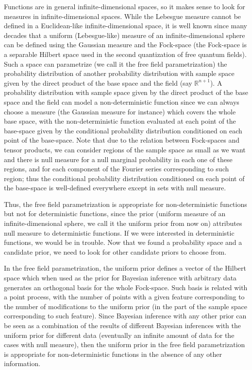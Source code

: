 \documentclass[11pt]{book}
\begin{document}
Functions are in general infinite-dimensional spaces, so it makes sense
to look for measures in infinite-dimensional spaces. While the Lebesgue
measure cannot be defined in a Euclidean-like infinite-dimensional
space\cite{baker1991lebesgue}\cite{baker2004lebesgue}, it is
well known since many decades that a uniform (Lebesgue-like) measure of
an infinite-dimensional sphere can be defined using the Gaussian measure
and the Fock-space (the Fock-space is a separable Hilbert space used in
the second quantization of free quantum
fields)\cite{peterson_gaussian_2019}.
Such a space can parametrize (we call it the free field parametrization)
the probability distribution of another probability distribution with
sample space given by the direct product of the base space and the field
(say \(\mathbb{R}^{n+1}\)). A probability distribution with sample space
given by the direct product of the base space and the field can model a
non-deterministic function since we can always choose a measure (the
Gaussian measure for instance) which covers the whole base space, with
the non-deterministic function evaluated at each point of the base-space
given by the conditional probability distribution conditioned on each
point of the base-space. Note that due to the relation between
Fock-spaces and tensor products, we can consider regions of the sample
space as small as we want and there is null measure for a null marginal
probability in each one of these regions, and for each component of the
Fourier series corresponding to such region; thus the conditional
probability distribution conditioned on each point of the base-space is
well-defined everywhere except in sets with null measure.

Thus, the free field parametrization is appropriate for
non-deterministic functions but not for deterministic functions, since
the prior (uniform measure of an infinite-dimensional sphere, we call it
the uniform prior from now on) attributes null measure to deterministic
functions. If we were interested in deterministic functions, we would be
in trouble\cite{baker1991lebesgue}\cite{baker2004lebesgue}. Now that
we found a probability space and a candidate prior, we need to look for
other candidate priors to choose from.

In the free field parametrization, the uniform prior defines a vector of
the Hilbert space which when used as the prior for Bayesian inference
with arbitrary data generates an orthogonal basis for the whole
Fock-space. Such basis is related with a point process, with the number
of points with a given feature corresponding to the number of
modifications to the uniform prior (in the part of the sample space
corresponding to such feature). Since Bayesian inference with any other
prior can be seen as a combination of the results of different Bayesian
inferences with the uniform prior for different data (eventually an
infinite amount of data for the cases with null measure), then the
uniform prior in the free field parametrization is appropriate for
non-deterministic functions in the absence of any other information.
\end{document}
